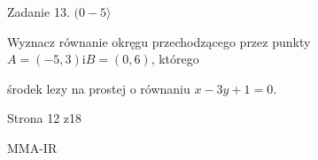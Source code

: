 \documentclass[a4paper,12pt]{article}
\begin{document}
Zadanie 13. $(0-5\rangle$

Wyznacz równanie okręgu przechodzącego przez punkty $A=(-5,3) \mathrm{i} B=(0,6)$, którego

środek lezy na prostej o równaniu $x-3y+1=0.$

Strona 12 z18

MMA-IR
\end{document}
